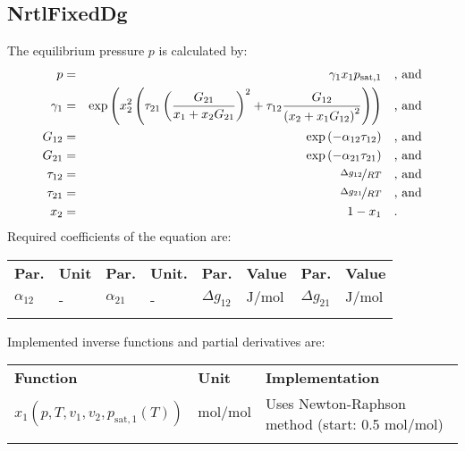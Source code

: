 \subsection{NrtlFixedDg}
\label{cha:approaches:abs:act:nrtl_fdg}
%
The equilibrium pressure $p$ is calculated by:
%
\begin{equation*}
	\begin{split}
		p &=& \gamma_1 x_1 p_\mathrm{sat,1} & \quad\text{, and} \\
		\gamma_1 &=& \exp \left( x_2^2 \left( \tau_{21} \left( \frac{G_{21}}{x_1 + x_2 G_{21}} \right) ^2 + \tau_{12} \frac{G_{12}}{\left( x_2 + x_1 G_{12} \right) ^2}\right) \right) & \quad\text{, and} \\
		G_{12} &=& \exp \left( -\alpha_{12} \tau_{12} \right) & \quad\text{, and} \\
		G_{21} &=& \exp \left( -\alpha_{21} \tau_{21} \right) & \quad\text{, and} \\
		\tau_{12} &=& \nicefrac{\Delta g_{12}}{R T} & \quad\text{, and} \\
		\tau_{21} &=& \nicefrac{\Delta g_{21}}{R T} & \quad\text{, and} \\
		x_2 &=& 1 - x_1  & \quad\text{.} \\
	\end{split}
\end{equation*}
%
Required coefficients of the equation are:
%
\begin{longtable}[l]{ll|ll|ll|ll}
\toprule
\addlinespace
\textbf{Par.} & \textbf{Unit} & \textbf{Par.} &	\textbf{Unit.} & \textbf{Par.} & \textbf{Value} & \textbf{Par.} & \textbf{Value} \\
\addlinespace
\midrule
\endhead

\bottomrule
\endfoot
\bottomrule
\endlastfoot
\addlinespace

$\alpha_{12}$ & - & $\alpha_{21}$ & - & $\Delta g_{12}$ & $\si{\joule\per\mole}$ & $\Delta g_{21}$ & $\si{\joule\per\mole}$ \\

\addlinespace
\end{longtable}
%
Implemented inverse functions and partial derivatives are:
%
\begin{longtable}[l]{l|l|p{7.5cm}}
	\toprule
	\addlinespace
	\textbf{Function} & \textbf{Unit} &	\textbf{Implementation} \\
	\addlinespace
	\midrule
	\endhead
	
	\bottomrule
	\endfoot
	\bottomrule
	\endlastfoot
	\addlinespace
	
	$x_1(p,T,v_1,v_2,p_\mathrm{sat,1}(T))$& $\si{\mole\per\mole}$ & Uses Newton-Raphson method (start: 0.5 $\si{\mole\per\mole}$) \\
	
	\addlinespace
\end{longtable}
%
